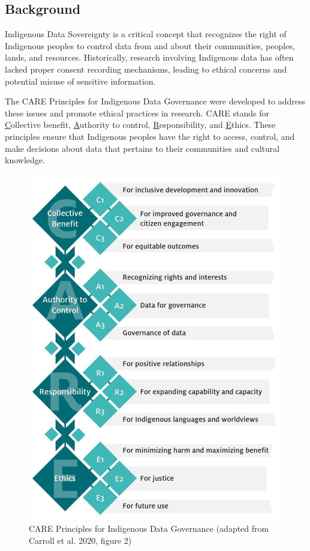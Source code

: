 \documentclass[a0,portrait]{a0poster}
\begin{document}
\begin{multicols}{2}

\color{ARDCPink}
\section*{\LARGE Background}
\color{DarkGrey}
\large{
Indigenous Data Sovereignty is a critical concept that recognizes the right of Indigenous peoples to control data from and about their communities, peoples, lands, and resources. Historically, research involving Indigenous data has often lacked proper consent recording mechanisms, leading to ethical concerns and potential misuse of sensitive information.

The CARE Principles for Indigenous Data Governance were developed to address these issues and promote ethical practices in research. CARE stands for \underline{C}ollective benefit, \underline{A}uthority to control, \underline{R}esponsibility, and \underline{E}thics. These principles ensure that Indigenous peoples have the right to access, control, and make decisions about data that pertains to their communities and cultural knowledge.

\par
\begin{figure}
\vspace{-2cm}  %
\includegraphics[width=0.43\columnwidth]{figures/CARE-principles.png}
\caption{CARE Principles for Indigenous Data Governance (adapted from Carroll et al. 2020, figure 2)}
\vspace{2cm}  %
\end{figure}

}
\end{multicols}
\end{document}
